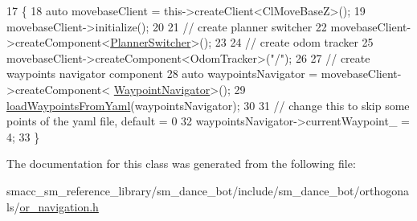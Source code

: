 \begin{DoxyCode}
17     \{
18         \textcolor{keyword}{auto} movebaseClient = this->createClient<ClMoveBaseZ>();
19         movebaseClient->initialize();
20 
21         \textcolor{comment}{// create planner switcher}
22         movebaseClient->createComponent<\hyperlink{classmove__base__z__client_1_1PlannerSwitcher}{PlannerSwitcher}>();
23 
24         \textcolor{comment}{// create odom tracker}
25         movebaseClient->createComponent<OdomTracker>(\textcolor{stringliteral}{"/"});
26 
27         \textcolor{comment}{// create waypoints navigator component}
28         \textcolor{keyword}{auto} waypointsNavigator = movebaseClient->createComponent<
      \hyperlink{classmove__base__z__client_1_1WaypointNavigator}{WaypointNavigator}>();
29         \hyperlink{classsm__dance__bot_1_1OrNavigation_a1f092ffe3a1b29ae9ea6623aff00ab16}{loadWaypointsFromYaml}(waypointsNavigator);
30 
31         \textcolor{comment}{// change this to skip some points of the yaml file, default = 0}
32         waypointsNavigator->currentWaypoint\_ = 4;
33     \}
\end{DoxyCode}


The documentation for this class was generated from the following file\+:\begin{DoxyCompactItemize}
\item 
smacc\+\_\+sm\+\_\+reference\+\_\+library/sm\+\_\+dance\+\_\+bot/include/sm\+\_\+dance\+\_\+bot/orthogonals/\hyperlink{sm__dance__bot_2include_2sm__dance__bot_2orthogonals_2or__navigation_8h}{or\+\_\+navigation.\+h}\end{DoxyCompactItemize}

